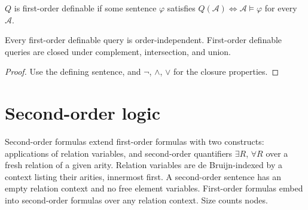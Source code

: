 \begin{definition}
  \label{def:desc-fo-definable}
  \leanok
  $Q$ is first-order definable if some sentence $\varphi$ satisfies
  $Q(\mathcal{A}) \iff \mathcal{A} \models \varphi$ for every $\mathcal{A}$.
\end{definition}

\begin{theorem}
  \label{thm:desc-fo-definable}
  \leanok
  Every first-order definable query is order-independent. First-order definable
  queries are closed under complement, intersection, and union.
\end{theorem}
\begin{proof}
  \leanok
  Use the defining sentence, and $\neg$, $\wedge$, $\vee$ for the closure
  properties.
\end{proof}

\section{Second-order logic}

\begin{definition}
  \label{def:desc-so-syntax}
  \leanok
  Second-order formulas extend first-order formulas with two constructs:
  applications of relation variables, and second-order quantifiers $\exists R$,
  $\forall R$ over a fresh relation of a given arity. Relation variables are
  de Bruijn-indexed by a context listing their arities, innermost first. A
  second-order sentence has an empty relation context and no free element
  variables. First-order formulas embed into second-order formulas over any
  relation context. Size counts nodes.
\end{definition}

